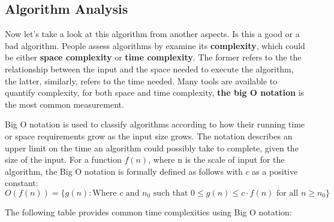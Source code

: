 \subsection{Algorithm Analysis}

\par Now let's take a look at this algorithm from another aspects. Is this a good or a bad algorithm. People assess algorithms by examine its \textbf{complexity}, which could be either \textbf{space complexity} or \textbf{time complexity}. The former refers to the the relationship between the input and the space needed to execute the algorithm, the latter, similarly, refers to the time needed. Many tools are available to quantify complexity, for both space and time complexity, \textbf{the big O notation} is the most common measurement. 
\begin{definition}\label{Big O}
    Big O notation is used to classify algorithms according to how their running time or space requirements grow as the input size grows. The notation describes an upper limit on the time an algorithm could possibly take to complete, given the size of the input. For a function \( f(n) \), where n is the scale of input for the algorithm, the Big O notation is formally defined as follows with $c$ as a positive constant:
    $$O(f(n)) = \{ g(n) : \text{Where } c \text{ and } n_0 
	\text{ such that } 0 \leq g(n) \leq c \cdot f(n) \text{ for all } n \geq n_0 \}$$
\end{definition}

The following table provides common time complexities using Big O notation:

